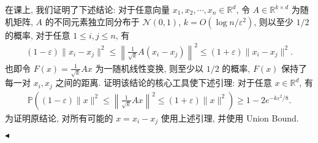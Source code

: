 \documentclass[11pt]{article}
\newenvironment{problem}[2][Problem]{\begin{trivlist}
    \item[\hskip \labelsep {\bfseries #1}\hskip \labelsep {\bfseries #2.}]\songti}{\hfill$\blacktriangleleft$\end{trivlist}}
\newcommand\1{\mathds{1}}
\newcommand\R{\mathbb{R}}
\newcommand\PP{\mathbb{P}}
\begin{document}
\begin{problem}{5}
    在课上, 我们证明了下述结论: 对于任意向量 $x_1, x_2, \cdots, x_n \in \R^d$, 令 $A \in \R^{k\times d}$ 为随机矩阵, 
    $A$ 的不同元素独立同分布于 $\mathcal{N}(0,1)$, $k=O(\log n/\varepsilon^2)$, 则以至少 $1/2$ 的概率, 
    对于任意 $1\le i,j \le n$, 有
    \begin{align*}
        (1-\varepsilon) \| x_i - x_j \|^2 \le \left\| \frac{1}{\sqrt{k}} A(x_i - x_j) \right\|^2 \le (1+\varepsilon) \| x_i - x_j \|^2.
    \end{align*}
    也即令 $F(x) = \frac{1}{\sqrt{k}} Ax$ 为一随机线性变换, 则至少以 $1/2$ 的概率, $F(x)$ 保持了每一对 $x_i, x_j$ 之间的距离.
    证明该结论的核心工具使下述引理: 对于任意 $x\in \R^d$, 有    
    \begin{align}
        \PP\left((1-\varepsilon)\| x\|^2 \le \left\| \frac{1}{\sqrt{k}} Ax \right\|^2 \le (1+\varepsilon)\| x\|^2\right) \ge 1 - 2e^{-k\varepsilon^2/8}.
        \label{lemma:5.1}
    \end{align}  
    为证明原结论, 对所有可能的 $x = x_i - x_j$ 使用上述引理, 并使用 Union Bound.


\end{problem}
\end{document}
